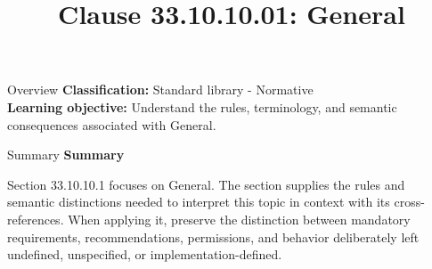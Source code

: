 \documentclass[10pt,letterpaper]{article}
\title{Clause 33.10.10.01: General}
\author{}
\date{}
\begin{document}
\maketitle
\begin{CornellOverviewBox}{Overview}
\textbf{Classification:} Standard library - Normative\\[2pt]
\textbf{Learning objective:} Understand the rules, terminology, and semantic consequences associated with General.
\end{CornellOverviewBox}\begin{CornellSummaryBox}{Summary}
{\sffamily\bfseries\color{Accent} Summary}\par\vspace{3pt}Section 33.10.10.1 focuses on General. The section supplies the rules and semantic distinctions needed to interpret this topic in context with its cross-references. When applying it, preserve the distinction between mandatory requirements, recommendations, permissions, and behavior deliberately left undefined, unspecified, or implementation-defined.
\end{CornellSummaryBox}
\end{document}
